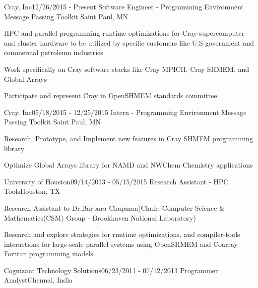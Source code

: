 \begin{rSubsection}{Cray, Inc}{12/26/2015 - Present}
                   {Software Engineer - Programming Environment Message Passing Toolkit}
                   {Saint Paul, MN}
\item HPC and parallel programming runtime optimizations for Cray supercomputer
      and cluster hardware to be utilized by specific customers like U.S
      government and commercial petroleum industries
\item Work specifically on Cray software stacks like Cray MPICH, Cray SHMEM, and
      Global Arrays
\item Participate and represent Cray in OpenSHMEM standards committee
\end{rSubsection}

\begin{rSubsection}{Cray, Inc}{05/18/2015 - 12/25/2015}
                   {Intern - Programming Environment Message Passing Toolkit}
                   {Saint Paul, MN}
\item Research, Prototype, and Implement new features in Cray SHMEM programming
      library
\item Optimize Global Arrays library for NAMD and NWChem Chemistry applications
\end{rSubsection}

\begin{rSubsection}{University of Houston}{09/14/2013 - 05/15/2015}
                   {Research Assistant - HPC Tools}{Houston, TX}
\item Research Assistant to Dr.Barbara Chapman(Chair, Computer Science
      \& Mathematics(CSM) Group - Brookhaven National Laboratory)
\item Research and explore strategies for runtime optimizations, and
      compiler-tools interactions for large-scale parallel systems using
      OpenSHMEM and Coarray Fortran programming models
\end{rSubsection}

\begin{rSubsection}{Cognizant Technology Solutions}{06/23/2011 - 07/12/2013}
                   {Programmer Analyst}{Chennai, India}
\end{rSubsection}
